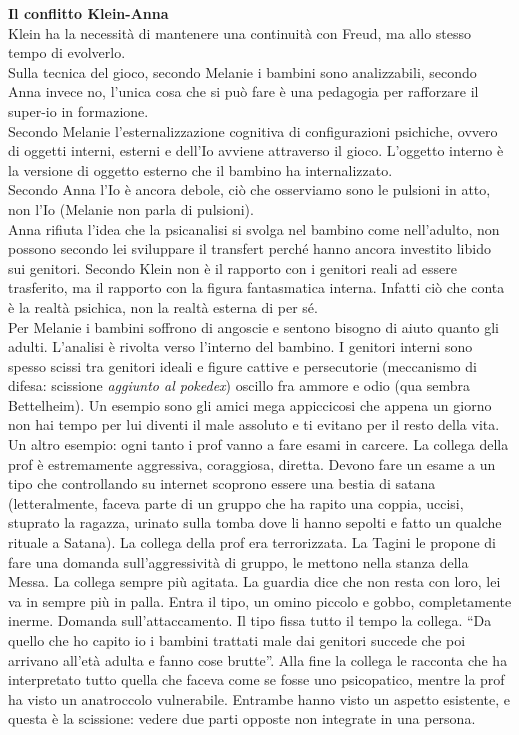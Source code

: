 \documentclass[
]{article}
\begin{document}
\textbf{Il conflitto Klein-Anna}\\
Klein ha la necessità di mantenere una continuità con Freud, ma allo
stesso tempo di evolverlo.\\
Sulla tecnica del gioco, secondo Melanie i bambini sono analizzabili,
secondo Anna invece no, l'unica cosa che si può fare è una pedagogia per
rafforzare il super-io in formazione.\\
Secondo Melanie l'esternalizzazione cognitiva di configurazioni
psichiche, ovvero di oggetti interni, esterni e dell'Io avviene
attraverso il gioco. L'oggetto interno è la versione di oggetto esterno
che il bambino ha internalizzato.\\
Secondo Anna l'Io è ancora debole, ciò che osserviamo sono le pulsioni
in atto, non l'Io (Melanie non parla di pulsioni).\\
Anna rifiuta l'idea che la psicanalisi si svolga nel bambino come
nell'adulto, non possono secondo lei sviluppare il transfert perché
hanno ancora investito libido sui genitori. Secondo Klein non è il
rapporto con i genitori reali ad essere trasferito, ma il rapporto con
la figura fantasmatica interna. Infatti ciò che conta è la realtà
psichica, non la realtà esterna di per sé.\\
Per Melanie i bambini soffrono di angoscie e sentono bisogno di aiuto
quanto gli adulti. L'analisi è rivolta verso l'interno del bambino. I
genitori interni sono spesso scissi tra genitori ideali e figure cattive
e persecutorie (meccanismo di difesa: scissione \emph{aggiunto al
pokedex}) oscillo fra ammore e odio (qua sembra Bettelheim). Un esempio
sono gli amici mega appiccicosi che appena un giorno non hai tempo per
lui diventi il male assoluto e ti evitano per il resto della vita.\\
Un altro esempio: ogni tanto i prof vanno a fare esami in carcere. La
collega della prof è estremamente aggressiva, coraggiosa, diretta.
Devono fare un esame a un tipo che controllando su internet scoprono
essere una bestia di satana (letteralmente, faceva parte di un gruppo
che ha rapito una coppia, uccisi, stuprato la ragazza, urinato sulla
tomba dove li hanno sepolti e fatto un qualche rituale a Satana). La
collega della prof era terrorizzata. La Tagini le propone di fare una
domanda sull'aggressività di gruppo, le mettono nella stanza della
Messa. La collega sempre più agitata. La guardia dice che non resta con
loro, lei va in sempre più in palla. Entra il tipo, un omino piccolo e
gobbo, completamente inerme. Domanda sull'attaccamento. Il tipo fissa
tutto il tempo la collega. ``Da quello che ho capito io i bambini
trattati male dai genitori succede che poi arrivano all'età adulta e
fanno cose brutte''. Alla fine la collega le racconta che ha
interpretato tutto quella che faceva come se fosse uno psicopatico,
mentre la prof ha visto un anatroccolo vulnerabile. Entrambe hanno visto
un aspetto esistente, e questa è la scissione: vedere due parti opposte
non integrate in una persona.
\end{document}
